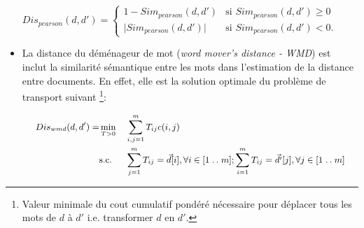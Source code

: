 \begin{itemize}
{\footnotesize $Dis_{pearson}(d,d') =
\left\{ \begin{array}{ll}
1 - Sim_{pearson}(d,d') & \text{si } Sim_{pearson}(d,d') \geq 0 \\
\vert Sim_{pearson}(d,d') \vert & \text{si } Sim_{pearson}(d,d') < 0.
\end{array}
\right.$}
	\item \og La distance du déménageur de mot \fg{} (\textit{word mover's distance - WMD}) \citep{kusner2015wordmoverdist} est inclut la similarité sémantique entre les mots dans l'estimation de la distance entre documents. En effet, elle est la solution optimale du problème de transport suivant \footnote{Valeur minimale du cout cumulatif pondéré nécessaire pour déplacer  tous les mots de $d$ à $d'$ i.e. transformer $d$ en $d'$.}:
	
	\begin{equation*}\small
	\begin{aligned}
Dis_{wmd}(d, d') = 	& \mathop{\mathrm{min}}\limits\limits_{T>0}
	& & \sum\limits_{i,j=1}^m T_{ij} c(i,j) \\
	& \text{s.c.}
	& & \sum\limits_{j=1}^m T_{ij} = \vec{d}[i], \forall i \in [1\mathrel{{.}\,{.}}\nobreak m];  \sum\limits_{i=1}^m T_{ij} = \vec{d'}[j], \forall j \in [1\mathrel{{.}\,{.}}\nobreak m]
	\end{aligned}
	\end{equation*} 
	

\end{itemize}
